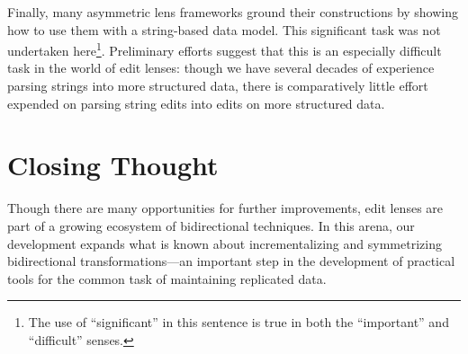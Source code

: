 Finally, many asymmetric lens frameworks ground their constructions by
showing how to use them with a string-based data model. This significant
task was not undertaken here\footnote{The use of ``significant'' in this
sentence is true in both the ``important'' and ``difficult'' senses.}.
Preliminary efforts suggest that this is an especially difficult task in the
world of edit lenses: though we have several decades of experience parsing
strings into more structured data, there is comparatively little effort
expended on parsing string edits into edits on more structured data.

\section{Closing Thought}
\label{sec:closing}
Though there are many opportunities for further improvements, edit lenses
are part of a growing ecosystem of bidirectional techniques. In this
arena, our development expands what is known about incrementalizing and
symmetrizing bidirectional transformations---an important step in the
development of practical tools for the common task of maintaining replicated
data.
